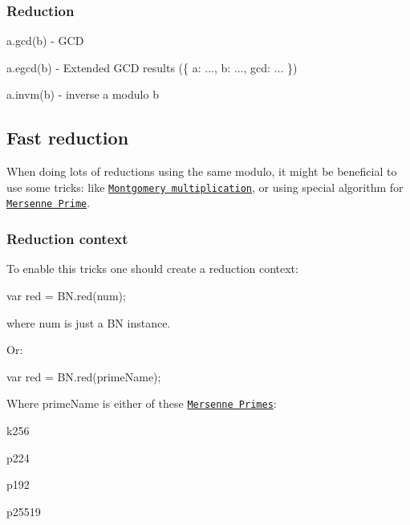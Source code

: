 \subsubsection*{Reduction}


\begin{DoxyItemize}
\item {\ttfamily a.\+gcd(b)} -\/ G\+CD
\item {\ttfamily a.\+egcd(b)} -\/ Extended G\+CD results ({\ttfamily \{ a\+: ..., b\+: ..., gcd\+: ... \}})
\item {\ttfamily a.\+invm(b)} -\/ inverse {\ttfamily a} modulo {\ttfamily b}
\end{DoxyItemize}

\subsection*{Fast reduction}

When doing lots of reductions using the same modulo, it might be beneficial to use some tricks\+: like \href{https://en.wikipedia.org/wiki/Montgomery_modular_multiplication}{\tt Montgomery multiplication}, or using special algorithm for \href{https://en.wikipedia.org/wiki/Mersenne_prime}{\tt Mersenne Prime}.

\subsubsection*{Reduction context}

To enable this tricks one should create a reduction context\+:


\begin{DoxyCode}
var red = BN.red(num);
\end{DoxyCode}
 where {\ttfamily num} is just a BN instance.

Or\+:


\begin{DoxyCode}
var red = BN.red(primeName);
\end{DoxyCode}


Where {\ttfamily prime\+Name} is either of these \href{https://en.wikipedia.org/wiki/Mersenne_prime}{\tt Mersenne Primes}\+:


\begin{DoxyItemize}
\item {\ttfamily \textquotesingle{}k256\textquotesingle{}}
\item {\ttfamily \textquotesingle{}p224\textquotesingle{}}
\item {\ttfamily \textquotesingle{}p192\textquotesingle{}}
\item {\ttfamily \textquotesingle{}p25519\textquotesingle{}}
\end{DoxyItemize}

